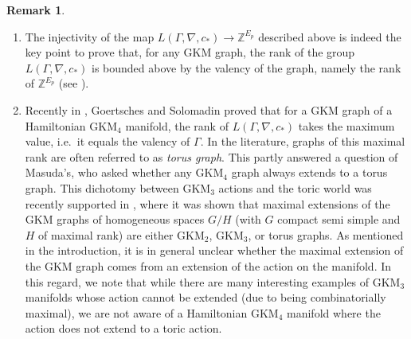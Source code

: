 \documentclass[12pt,a4paper]{amsart}
\newcommand{\ZZ}{\mathbb{Z}}
\theoremstyle{plain}
\theoremstyle{definition}
\newtheorem{rem}[thm]{Remark}
\begin{document}
\begin{rem}
\begin{enumerate}
\item The injectivity of the map $L(\Gamma,\nabla,c_*)\rightarrow \ZZ^{E_p}$ described
	above is indeed the key point to prove that, for any GKM graph, the rank of the group
	$L(\Gamma,\nabla,c_*)$ is bounded above by the valency of the graph, namely the rank of
	$\ZZ^{E_p}$ (see \cite[Lemma 3.2]{MR3943448}).
	\item
Recently in \cite{GoertschesSolomadin},
	Goertsches and Solomadin proved that for a GKM graph of a Hamiltonian GKM$_{4}$ manifold, the rank of $L(\Gamma,\nabla,c_*)$ takes the maximum value, i.e.\ it equals the valency of $\Gamma$. In the literature, graphs of this maximal rank are often referred to as \emph{torus graph}. This partly answered a question of Masuda's, who asked whether any GKM$_4$ graph always extends to a torus graph. This dichotomy between GKM$_3$ actions and the toric world was recently supported in \cite[Theorem 2]{KurokiSolomadin}, where it was shown that maximal extensions of the GKM graphs of homogeneous spaces $G/H$ (with $G$ compact semi simple and $H$ of maximal rank) are either GKM$_2$, GKM$_3$, or torus graphs. As mentioned in the introduction, it is in general unclear whether the maximal extension of the GKM graph comes from an extension of the action on the manifold. In this regard, we note that while there are many interesting examples of GKM$_3$ manifolds whose action cannot be extended (due to being combinatorially maximal), we are not aware of a Hamiltonian GKM$_4$ manifold where the action does not extend to a toric action.
	
\end{enumerate}
\end{rem}
\end{document}
